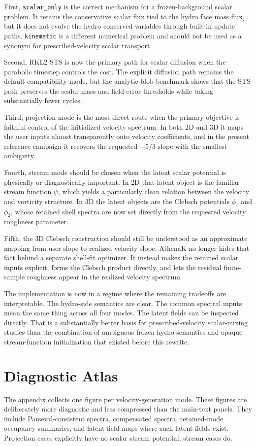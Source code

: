 \documentclass[twocolumn]{aastex7}
\newcommand{\code}[1]{\texttt{#1}}
\newcommand{\SO}{\code{scalar\_only}\xspace}
\newcommand{\kin}{\code{kinematic}\xspace}
\begin{document}
First, \SO is the correct mechanism for a frozen-background scalar problem. It retains the conservative scalar flux tied to the hydro face mass flux, but it does not evolve the hydro conserved variables through built-in update paths. \kin is a different numerical problem and should not be used as a synonym for prescribed-velocity scalar transport.

Second, RKL2 STS is now the primary path for scalar diffusion when the parabolic timestep controls the cost. The explicit diffusion path remains the default compatibility mode, but the analytic blob benchmark shows that the STS path preserves the scalar mass and field-error thresholds while taking substantially fewer cycles.

Third, projection mode is the most direct route when the primary objective is faithful control of the initialized velocity spectrum. In both 2D and 3D it maps the user inputs almost transparently onto velocity coefficients, and in the present reference campaign it recovers the requested $-5/3$ slope with the smallest ambiguity.

Fourth, stream mode should be chosen when the latent scalar potential is
physically or diagnostically important. In 2D that latent object is the
familiar stream function $\psi$, which yields a particularly clean relation
between the velocity and vorticity structure. In 3D the latent objects are the
Clebsch potentials $\phi_1$ and $\phi_2$, whose retained shell spectra are now
set directly from the requested velocity roughness parameter.

Fifth, the 3D Clebsch construction should still be understood as an
approximate mapping from user slope to realized velocity slope. AthenaK no
longer hides that fact behind a separate shell-fit optimizer. It instead makes
the retained scalar inputs explicit, forms the Clebsch product directly, and
lets the residual finite-sample roughness appear in the realized velocity
spectrum.

The implementation is now in a regime where the remaining tradeoffs are interpretable. The hydro-side semantics are clear. The common spectral inputs mean the same thing across all four modes. The latent fields can be inspected directly. That is a substantially better basis for prescribed-velocity scalar-mixing studies than the combination of ambiguous frozen-hydro semantics and opaque stream-function initialization that existed before this rewrite.

\appendix

\section{Diagnostic Atlas}
The appendix collects one figure per velocity-generation mode. These figures are deliberately more diagnostic and less compressed than the main-text panels. They include Parseval-consistent spectra, compensated spectra, retained-mode occupancy summaries, and latent-field maps where such latent fields exist. Projection cases explicitly have no scalar stream potential; stream cases do.
\end{document}
